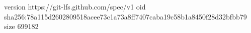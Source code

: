 version https://git-lfs.github.com/spec/v1
oid sha256:78a115d2602809518acee73c1a73a8ff7407caba19c58b1a8450f28d32bfbb79
size 699182
